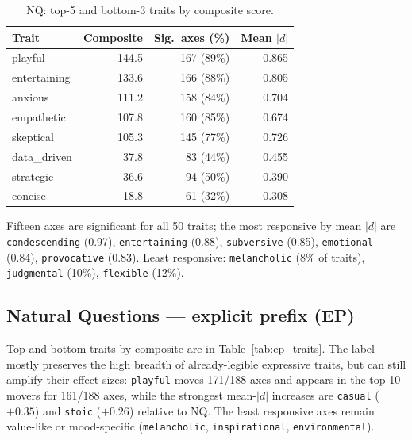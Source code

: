 \documentclass{article}
\newcommand{\ax}[1]{\texttt{#1}}   %
\begin{document}
\begin{table}[htbp]
\centering
\begin{tabular}{lrrr}
\toprule
Trait & Composite & Sig.\ axes (\%) & Mean $|d|$ \\
\midrule
playful      & 144.5 & 167 (89\%) & 0.865 \\
entertaining & 133.6 & 166 (88\%) & 0.805 \\
anxious      & 111.2 & 158 (84\%) & 0.704 \\
empathetic   & 107.8 & 160 (85\%) & 0.674 \\
skeptical    & 105.3 & 145 (77\%) & 0.726 \\
\midrule
data\_driven & 37.8  & 83 (44\%)  & 0.455 \\
strategic    & 36.6  & 94 (50\%)  & 0.390 \\
concise      & 18.8  & 61 (32\%)  & 0.308 \\
\bottomrule
\end{tabular}
\caption{\textsc{NQ}: top-5 and bottom-3 traits by composite score.}
\label{tab:nq_traits}
\end{table}

Fifteen axes are significant for all 50 traits; the most responsive by mean $|d|$ are \ax{condescending} (0.97), \ax{entertaining} (0.88), \ax{subversive} (0.85), \ax{emotional} (0.84), \ax{provocative} (0.83). Least responsive: \ax{melancholic} (8\% of traits), \ax{judgmental} (10\%), \ax{flexible} (12\%).

\subsection{Natural Questions --- explicit prefix (\textsc{EP})}
Top and bottom traits by composite are in Table~\ref{tab:ep_traits}. The label mostly preserves the high breadth of already-legible expressive traits, but can still amplify their effect sizes: \ax{playful} moves 171/188 axes and appears in the top-10 movers for 161/188 axes, while the strongest mean-$|d|$ increases are \ax{casual} ($+0.35$) and \ax{stoic} ($+0.26$) relative to \textsc{NQ}. The least responsive axes remain value-like or mood-specific (\ax{melancholic}, \ax{inspirational}, \ax{environmental}).
\end{document}
